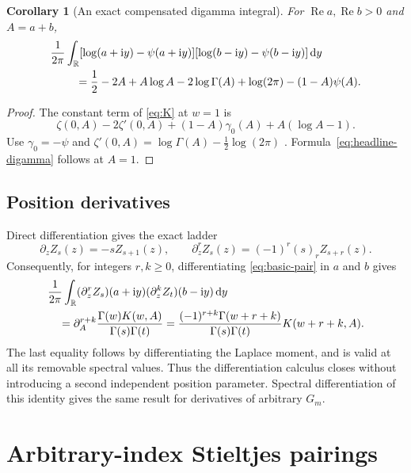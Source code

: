 \documentclass[11pt,a4paper]{article}
\newtheorem{corollary}[theorem]{Corollary}
\theoremstyle{definition}
\numberwithin{equation}{section}
\newcommand{\R}{\mathbb R}
\newcommand{\Rea}{\operatorname{Re}}
\newcommand{\dd}{\,\mathrm d}
\newcommand{\ii}{\mathrm i}
\begin{document}
\begin{corollary}[An exact compensated digamma integral]\label{thm:digamma}
For $\Rea a,\Rea b>0$ and $A=a+b$,
\begin{align}
 &\frac1{2\pi}\int_{\R}
 [\log(a+\ii y)-\psi(a+\ii y)]
 [\log(b-\ii y)-\psi(b-\ii y)]\dd y \notag\\
 &\hspace{8mm}=
 \frac12-2A+A\log A-2\log\Gamma(A)+\log(2\pi)
       -(1-A)\psi(A).\label{eq:digamma-pair}
\end{align}
\end{corollary}
\begin{proof}
The constant term of \eqref{eq:K} at $w=1$ is
\[
 \zeta(0,A)-2\zeta'(0,A)+(1-A)\gamma_0(A)+A(\log A-1).
\]
Use $\gamma_0=-\psi$ and
$\zeta'(0,A)=\log\Gamma(A)-\frac12\log(2\pi)$
\cite{dlmf-zeta}. Formula~\eqref{eq:headline-digamma} follows at $A=1$.
\end{proof}

\subsection{Position derivatives}
Direct differentiation gives the exact ladder
\begin{equation}\label{eq:Z-position-ladder}
 \partial_z Z_s(z)=-sZ_{s+1}(z),\qquad
 \partial_z^r Z_s(z)=(-1)^r(s)_r Z_{s+r}(z).
\end{equation}
Consequently, for integers $r,k\ge0$, differentiating
\eqref{eq:basic-pair} in $a$ and $b$ gives
\begin{align}
 &\frac1{2\pi}\int_{\R}
    (\partial_z^r Z_s)(a+\ii y)(\partial_z^k Z_t)(b-\ii y)\dd y
       \notag\\
 &\quad=\partial_A^{r+k}
       \frac{\Gamma(w)K(w,A)}{\Gamma(s)\Gamma(t)}
   =\frac{(-1)^{r+k}\Gamma(w+r+k)}{\Gamma(s)\Gamma(t)}
                K(w+r+k,A).\label{eq:position-pair}
\end{align}
The last equality follows by differentiating the Laplace moment, and is
valid at all its removable spectral values. Thus the differentiation
calculus closes without introducing a second independent position
parameter. Spectral differentiation of this identity gives the same result
for derivatives of arbitrary $G_m$.

\section{Arbitrary-index Stieltjes pairings}
\label{sec:stieltjes}
\end{document}

